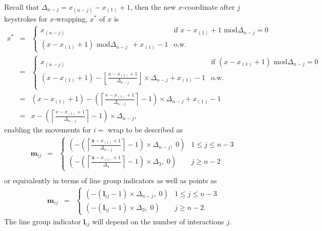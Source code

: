 \documentclass[12pt]{article}
\begin{document}
Recall that $\Delta_{n-j}=x_{(n-j)}-x_{(1)}+1$,
then the new $x$-coordinate after $j$ keystrokes
for $x$-wrapping, $x^*$ of $x$ is
\begin{eqnarray*}
x^* & = & \begin{cases}
x_{(n-j)}  & \mbox{if~} x-x_{(1)}+1 \mbox{~mod}\Delta_{n-j} = 0\\
(x-x_{(1)}+1) \mbox{~mod}\Delta_{n-j} ~~+x_{(1)}-1 &  \mbox{o.w.}
\end{cases} \\
& = & \begin{cases}
x_{(n-j)}  & \mbox{if~} (x-x_{(1)}+1) \mbox{~mod}\Delta_{n-j} = 0\\
(x-x_{(1)}+1)-\left\lfloor\frac{x-x_{(1)}+1}{\Delta_{n-j}}\right\rfloor\times\Delta_{n-j}+x_{(1)}-1 &\mbox{o.w.}\\
\end{cases} \\
 & = &
(x-x_{(1)}+1)-\left(\left\lceil\frac{x-x_{(1)}+1}{\Delta_{n-j}}\right\rceil -1\right)\times \Delta_{n-j} +x_{(1)}-1 \\ & = &
x-\left(\left\lceil \frac{x-x_{(1)}+1}{\Delta_{n-j}}\right\rceil -1\right)\times\Delta_{n-j},
\end{eqnarray*}
enabling the movements for $i=$ wrap to be described as
\begin{eqnarray*}
\mathbf{m}{}_{ij} & = & \begin{cases}
(-\left(\left\lceil \frac{\mathbf{x}-x_{(1)}+1}{\Delta_{n-j}}\right\rceil -1\right)\times\Delta_{n-j}, \; 0) & 1\leq j \leq n-3 \\
(-\left(\left\lceil \frac{\mathbf{x}-x_{(1)}+1}{\Delta_3}\right\rceil -1\right)\times\Delta_3, \; 0) & j\ge n-2
\end{cases} \\
\end{eqnarray*}
or equivalently in terms of line group indicators as well as points as
\begin{eqnarray*}
\mathbf{m}{}_{ij} & = & \begin{cases}
(-(\mathbf{l}{}_{ij} -1)\times\Delta_{n-j}, \; 0) & 1\leq j \leq n-3 \\
(-(\mathbf{l}{}_{ij} -1)\times\Delta_3, \; 0) & j\ge n-2.
\end{cases}
\end{eqnarray*}
The line group indicator $\mathbf{l}{}_{ij}$ will depend on
the number of interactions $j$.
\end{document}
